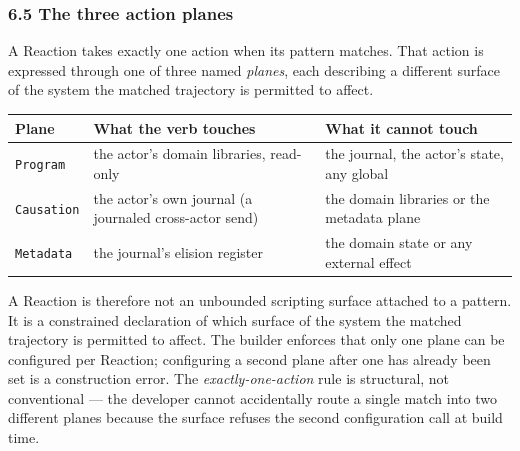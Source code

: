 \documentclass[
]{article}
\newcounter{none} %
\let\origtexttt\texttt%
\renewcommand{\texttt}[1]{\origtexttt{\seqsplit{#1}}}%
\let\texttt\origtexttt%
\begin{document}
\subsubsection{6.5 The three action
planes}\label{the-three-action-planes}

A Reaction takes exactly one action when its pattern matches. That
action is expressed through one of three named \emph{planes}, each
describing a different surface of the system the matched trajectory is
permitted to affect.

{\def\LTcaptype{none} %
\begin{longtable}[]{@{}
  >{\raggedright\arraybackslash}p{}
  >{\raggedright\arraybackslash}p{}
  >{\raggedright\arraybackslash}p{}@{}}
\toprule\noalign{}
\begin{minipage}[b]{\linewidth}\raggedright
Plane
\end{minipage} & \begin{minipage}[b]{\linewidth}\raggedright
What the verb touches
\end{minipage} & \begin{minipage}[b]{\linewidth}\raggedright
What it cannot touch
\end{minipage} \\
\midrule\noalign{}
\endhead
\bottomrule\noalign{}
\endlastfoot
\texttt{Program} & the actor's domain libraries, read-only & the
journal, the actor's state, any global \\
\texttt{Causation} & the actor's own journal (a journaled cross-actor
send) & the domain libraries or the metadata plane \\
\texttt{Metadata} & the journal's elision register & the domain state or
any external effect \\
\end{longtable}
}

A Reaction is therefore not an unbounded scripting surface attached to a
pattern. It is a constrained declaration of which surface of the system
the matched trajectory is permitted to affect. The builder enforces that
only one plane can be configured per Reaction; configuring a second
plane after one has already been set is a construction error. The
\emph{exactly-one-action} rule is structural, not conventional --- the
developer cannot accidentally route a single match into two different
planes because the surface refuses the second configuration call at
build time.
\end{document}
